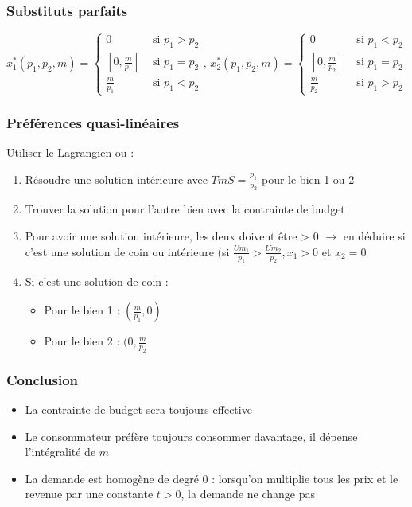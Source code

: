\subsubsection{Substituts parfaits}

\begin{equation*}
x^*_1(p_1,p_2,m) =
\begin{cases}
	0 &\text{ si } p_1 > p_2\\
	[0, \frac{m}{p_1}] &\text{ si } p_1 = p_2\\
	\frac{m}{p_1} &\text{ si } p_1 < p_2
\end{cases}
\text{, }
x^*_2(p_1,p_2,m) =
\begin{cases}
	0 &\text{ si } p_1 < p_2\\
	[0, \frac{m}{p_2}] &\text{ si } p_1 = p_2\\
	\frac{m}{p_2} &\text{ si } p_1 > p_2
\end{cases}
\end{equation*}

\subsubsection{Préférences quasi-linéaires}

Utiliser le Lagrangien ou :
\begin{enumerate}
\item Résoudre une solution intérieure avec $TmS = \frac{p_1}{p_2}$ pour le bien 1 ou 2
\item Trouver la solution pour l'autre bien avec la contrainte de budget
\item Pour avoir une solution intérieure, les deux doivent être > 0 $\rightarrow$ en déduire si c'est une solution de coin ou intérieure (si $\frac{Um_1}{p_1} > \frac{Um_2}{p_2}, x_1 > 0$ et $x_2 = 0$
\item Si c'est une solution de coin :
\begin{itemize}
\item Pour le bien 1 : $(\frac{m}{p_1}, 0)$
\item Pour le bien 2 : $(0, \frac{m}{p_2}$
\end{itemize}
\end{enumerate}

\subsubsection{Conclusion}

\begin{itemize}
\item La contrainte de budget sera toujours effective
\item Le consommateur préfère toujours consommer davantage, il dépense l'intégralité de $m$
\item La demande est homogène de degré 0 : lorsqu'on multiplie tous les prix et le revenue par une constante $t > 0$, la demande ne change pas
\end{itemize}

